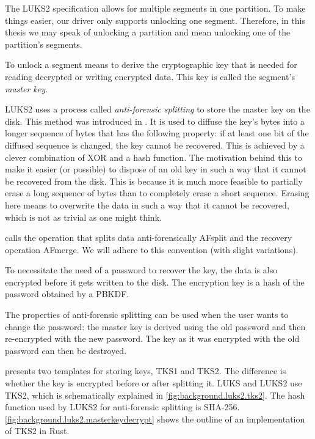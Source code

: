 
The LUKS2 specification allows for multiple segments in one partition. To make things easier, our driver only supports unlocking one segment. Therefore, in this thesis we may speak of unlocking a partition and mean unlocking one of the partition's segments.

To unlock a segment means to derive the cryptographic key that is needed for reading decrypted or writing encrypted data. This key is called the segment's \emph{master key}.

LUKS2 uses a process called \emph{anti-forensic splitting} to store the master key on the disk. This method was introduced in \cite{Fruhwirth2005}. It is used to diffuse the key's bytes into a longer sequence of bytes that has the following property: if at least one bit of the diffused sequence is changed, the key cannot be recovered. This is achieved by a clever combination of XOR and a hash function. The motivation behind this to make it easier (or possible) to dispose of an old key in such a way that it cannot be recovered from the disk. This is because it is much more feasible to partially erase a long sequence of bytes than to completely erase a short sequence. Erasing here means to overwrite the data in such a way that it cannot be recovered, which is not as trivial as one might think.

\cite{Fruhwirth2005} calls the operation that splits data anti-forensically AFsplit and the recovery operation AFmerge. We will adhere to this convention (with slight variations).

To necessitate the need of a password to recover the key, the data is also encrypted before it gets written to the disk. The encryption key is a hash of the password obtained by a PBKDF.

The properties of anti-forensic splitting can be used when the user wants to change the password: the master key is derived using the old password and then re-encrypted with the new password. The key as it was encrypted with the old password can then be destroyed.

\cite{Fruhwirth2005} presents two templates for storing keys, TKS1 and TKS2. The difference is whether the key is encrypted before or after splitting it. LUKS and LUKS2 use TKS2, which is schematically explained in \autoref{fig:background.luks2.tks2}. The hash function used by LUKS2 for anti-forensic splitting is SHA-256. \autoref{fig:background.luks2.masterkeydecrypt} shows the outline of an implementation of TKS2 in Rust.

